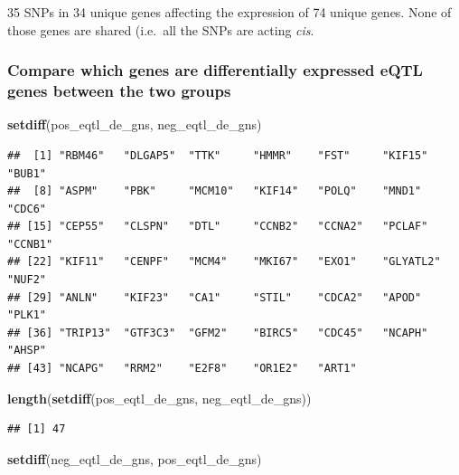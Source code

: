 \documentclass[]{article}
\newenvironment{Shaded}{\begin{snugshade}}{\end{snugshade}}
\newcommand{\KeywordTok}[1]{\textcolor[rgb]{0.13,0.29,0.53}{\textbf{#1}}}
\newcommand{\NormalTok}[1]{#1}
\begin{document}
35 SNPs in 34 unique genes affecting the expression of 74 unique genes.
None of those genes are shared (i.e.~all the SNPs are acting \emph{cis}.

\subsubsection{Compare which genes are differentially expressed eQTL
genes between the two
groups}\label{compare-which-genes-are-differentially-expressed-eqtl-genes-between-the-two-groups}

\begin{Shaded}
\begin{Highlighting}[]
\KeywordTok{setdiff}\NormalTok{(pos_eqtl_de_gns, neg_eqtl_de_gns)}
\end{Highlighting}
\end{Shaded}

\begin{verbatim}
##  [1] "RBM46"   "DLGAP5"  "TTK"     "HMMR"    "FST"     "KIF15"   "BUB1"   
##  [8] "ASPM"    "PBK"     "MCM10"   "KIF14"   "POLQ"    "MND1"    "CDC6"   
## [15] "CEP55"   "CLSPN"   "DTL"     "CCNB2"   "CCNA2"   "PCLAF"   "CCNB1"  
## [22] "KIF11"   "CENPF"   "MCM4"    "MKI67"   "EXO1"    "GLYATL2" "NUF2"   
## [29] "ANLN"    "KIF23"   "CA1"     "STIL"    "CDCA2"   "APOD"    "PLK1"   
## [36] "TRIP13"  "GTF3C3"  "GFM2"    "BIRC5"   "CDC45"   "NCAPH"   "AHSP"   
## [43] "NCAPG"   "RRM2"    "E2F8"    "OR1E2"   "ART1"
\end{verbatim}

\begin{Shaded}
\begin{Highlighting}[]
\KeywordTok{length}\NormalTok{(}\KeywordTok{setdiff}\NormalTok{(pos_eqtl_de_gns, neg_eqtl_de_gns))}
\end{Highlighting}
\end{Shaded}

\begin{verbatim}
## [1] 47
\end{verbatim}

\begin{Shaded}
\begin{Highlighting}[]
\KeywordTok{setdiff}\NormalTok{(neg_eqtl_de_gns, pos_eqtl_de_gns)}
\end{Highlighting}
\end{Shaded}
\end{document}
